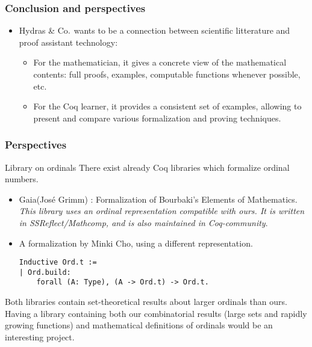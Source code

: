 \documentclass[10pt]{beamer}
\newcommand{\TODO}[2][]{[\textcolor{red}{TODO (#1):} \emph{#2}]}
\newcommand{\coq}{Coq\xspace}
\newcommand{\community}{Coq-community\xspace}
\newcommand{\gaia}{Gaia\xspace}
\newcommand{\Hydras}{Hydras \& Co$\text.$\xspace}
\begin{document}


\begin{frame}
  \frametitle{Conclusion and perspectives}
  \begin{block}{}
    \begin{itemize}
    \item \Hydras wants to be a connection between scientific litterature and proof assistant technology:
      \begin{itemize}
      \item For the mathematician, it gives a concrete view of the mathematical contents: full proofs, examples, computable functions whenever possible, etc.
        \item  For the \coq learner, it provides a consistent set of examples,
allowing to present and compare various formalization and proving techniques.
      \end{itemize}
    \end{itemize}
  \end{block}
  \end{frame}


\begin{frame}[fragile]
  \frametitle{Perspectives}
  \begin{block}{Library on ordinals}
    There exist already \coq libraries which formalize ordinal numbers.
    \begin{itemize}
    \item \gaia (José Grimm) : Formalization of Bourbaki's Elements of Mathematics. {\color{lookcolor}\emph{This library uses an ordinal representation compatible with ours. It is  written in SSReflect/Mathcomp, and is also maintained in \community}.}
    \item A formalization by Minki Cho, using a different representation.
{\color{darkorange}
\begin{verbatim}
Inductive Ord.t :=
| Ord.build: 
    forall (A: Type), (A -> Ord.t) -> Ord.t.
\end{verbatim}
}  
    \end{itemize}

    Both libraries contain set-theoretical results about larger ordinals than ours. Having a library containing both our combinatorial results (large sets and rapidly growing functions) and mathematical definitions of ordinals would be an interesting project.
  \end{block}
\end{frame}
\end{document}

